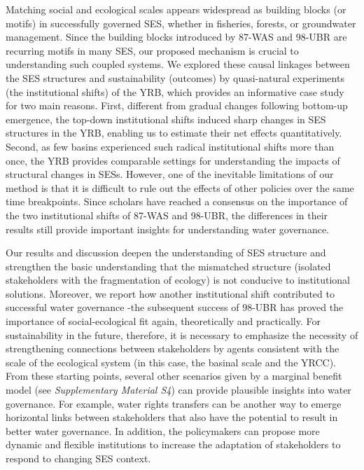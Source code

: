 {Matching social and ecological scales appears widespread as building blocks (or motifs) in successfully governed SES, whether in fisheries, forests, or groundwater management.
Since the building blocks introduced by 87-WAS and 98-UBR are recurring motifs in many SES, our proposed mechanism is crucial to understanding such coupled systems.
We explored these causal linkages between the SES structures and sustainability (outcomes) by quasi-natural experiments (the institutional shifts) of the YRB, which provides an informative case study for two main reasons.
First, different from gradual changes following bottom-up emergence, the top-down institutional shifts induced sharp changes in SES structures in the YRB, enabling us to estimate their net effects quantitatively.
Second, as few basins experienced such radical institutional shifts more than once, the YRB provides comparable settings for understanding the impacts of structural changes in SESs.
However, one of the inevitable limitations of our method is that it is difficult to rule out the effects of other policies over the same time breakpoints.
Since scholars have reached a consensus on the importance of the two institutional shifts of 87-WAS and 98-UBR, the differences in their results still provide important insights for understanding water governance.

Our results and discussion deepen the understanding of SES structure and strengthen the basic understanding that the mismatched structure (isolated stakeholders with the fragmentation of ecology) is not conducive to institutional solutions.
Moreover, we report how another institutional shift contributed to successful water governance  -the subsequent success of 98-UBR has proved the importance of social-ecological fit again, theoretically and practically.
For sustainability in the future, therefore, it is necessary to emphasize the necessity of strengthening connections between stakeholders by agents consistent with the scale of the ecological system (in this case, the basinal scale and the YRCC).
From these starting points, several other scenarios given by a marginal benefit model (see \textit{Supplementary Material S4}) can provide plausible insights into water governance.
For example, water rights transfers can be another way to emerge horizontal links between stakeholders that also have the potential to result in better water governance.
In addition, the policymakers can propose more dynamic and flexible institutions to increase the adaptation of stakeholders to respond to changing SES context.

}
